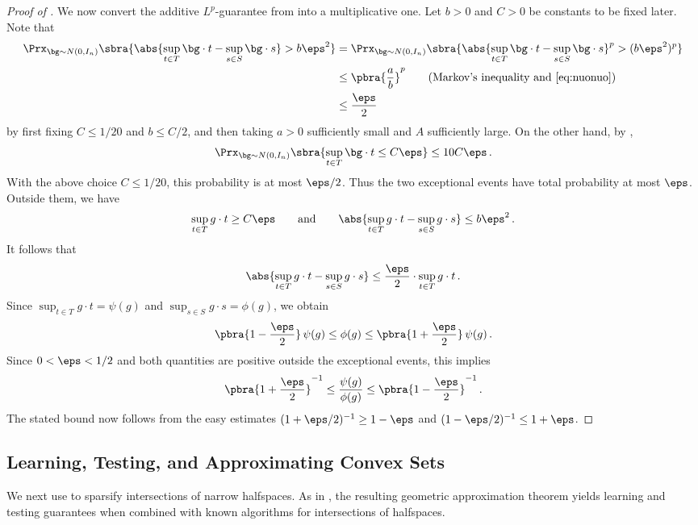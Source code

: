 \documentclass[11pt]{article}
\begin{document}
\begin{proof}[Proof of ]
	We now convert the additive $L^p$-guarantee from  into a multiplicative one. 
	Let $b>0$ and $C>0$ be constants to be fixed later.
	Note that 
	\begin{align*}
		\Prx_{\bg\sim N(0,I_n)}
		\sbra{
			\abs{
				\sup_{t\in T}\bg\cdot t
				-
				\sup_{s\in S}\bg\cdot s
			}
			>
			b\eps^2
		} 
		&=
		\Prx_{\bg\sim N(0,I_n)}
		\sbra{
			\abs{
				\sup_{t\in T}\bg\cdot t
				-
				\sup_{s\in S}\bg\cdot s
			}^p
			>
			(b\eps^2)^p
		} \\
		&\leq \pbra{\frac{a}{b}}^p \tag{Markov's inequality and \Cref{eq:nuonuo}}  \\
		&\leq \frac{\eps}{2} 
	\end{align*}
	by first fixing $C\leq 1/20$ and $b\leq C/2$, and then taking $a>0$ sufficiently small and $A$ sufficiently large.
	On the other hand, by , 
	\[
		\Prx_{\bg\sim N(0,I_n)}
		\sbra{
			\sup_{t\in T}\bg\cdot t
			\leq
			C\eps
		}
		\leq
		10C\eps\,.
	\]
	With the above choice $C\leq 1/20$, this probability is at most $\eps/2$.  
	Thus the two exceptional events have total probability at most $\eps$.  
	Outside them, we have
	\[
		\sup_{t\in T}g\cdot t
		\geq
		C\eps 
		\qquad\text{and}\qquad 
		\abs{
			\sup_{t\in T}g\cdot t
			-
			\sup_{s\in S}g\cdot s
		}
		\leq
		b\eps^2\,.
	\]
	It follows that 
	\[
		\abs{
			\sup_{t\in T}g\cdot t
			-
			\sup_{s\in S}g\cdot s
		}
		\leq
		\frac{\eps}{2}\cdot 
		\sup_{t\in T}g\cdot t\,.
	\]
	Since $\sup_{t\in T}g\cdot t=\psi(g)$ and $\sup_{s\in S}g\cdot s=\phi(g)$, we obtain
	\[
		\pbra{1-\frac{\eps}{2}}\,\psi(g)
		\leq
		\phi(g)
		\leq
		\pbra{1+\frac{\eps}{2}}\,\psi(g)\,.
	\]	
	Since $0<\eps<1/2$ and both quantities are positive outside the exceptional events, this implies 
	\[
		\pbra{1 + \frac{\eps}{2}}^{-1}
		\leq
		\frac{\psi(g)}{\phi(g)}
		\leq
		\pbra{1 - \frac{\eps}{2}}^{-1}\,.
	\]
	The stated bound now follows from the easy estimates $(1+\eps/2)^{-1}\geq1-\eps$ and $(1-\eps/2)^{-1}\leq1+\eps$. 
\end{proof} 

\subsection{Learning, Testing, and Approximating Convex Sets} 
\label{subsec:apps-polytope}

We next use  to sparsify intersections of narrow halfspaces.  
As in \cite{de2026sparsifying}, the resulting geometric approximation theorem yields learning and testing guarantees when combined with known algorithms for intersections of halfspaces. 
\end{document}
